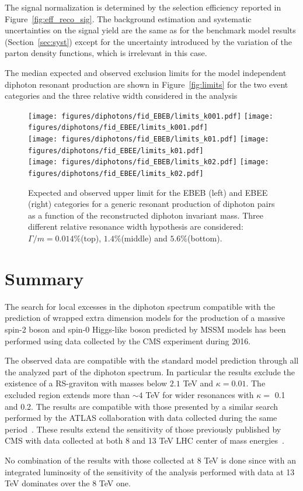 The signal normalization is determined by the selection efficiency reported in Figure~\ref{fig:eff_reco_sig}.
The background estimation and systematic uncertainties on the signal yield are the same as for the benchmark model
results (Section~\ref{sec:syst}) except for the uncertainty introduced by the variation of the parton density functions, which
is irrelevant in this case.

The median expected and observed exclusion limits for the model independent diphoton resonant production 
are shown in Figure~\ref{fig:limits} for the two event categories and the three relative width considered in the analysis

\begin{figure}[h!]
  \centering
  \texttt{[image: figures/diphotons/fid\_EBEB/limits\_k001.pdf]}
  \texttt{[image: figures/diphotons/fid\_EBEE/limits\_k001.pdf]}\\
  \texttt{[image: figures/diphotons/fid\_EBEB/limits\_k01.pdf]}
  \texttt{[image: figures/diphotons/fid\_EBEE/limits\_k01.pdf]}\\
  \texttt{[image: figures/diphotons/fid\_EBEB/limits\_k02.pdf]}
  \texttt{[image: figures/diphotons/fid\_EBEE/limits\_k02.pdf]}\\
    \caption{
      Expected and observed upper limit for the EBEB (left) and EBEE (right) categories for a generic
      resonant production of diphoton pairs as a function of the reconstructed diphoton invariant mass.
      Three different relative resonance width hypothesis are considered: $\Gamma/m = 0.014\%$(top), $1.4\%$(middle) and $5.6\%$(bottom).
    }
    \label{fig:fiducial_limits}
\end{figure}

\section{Summary}
\label{sec:dipho_summary}
The search for local excesses in the diphoton spectrum compatible with the prediction of wrapped extra dimension models
for the production of a massive spin-2 boson and spin-0 Higgs-like boson predicted by MSSM models
has been performed using data collected by the CMS experiment during 2016.

The observed data are compatible with the standard model prediction through all the analyzed part of the diphoton
spectrum. In particular the results exclude the existence of a RS-graviton with masses below $2.1$ TeV and $\kappa = 0.01$.
The excluded region extends more than $\sim 4$ TeV for wider resonances with $\kappa =$ 0.1 and 0.2.
The results are compatible with those presented by a similar search performed by the ATLAS collaboration with
data collected during the same period~\cite{atlas_dipho_2016}.
These results extend the sensitivity of those previously published by CMS with data collected at both 8 and 13 TeV
LHC center of mass energies~\cite{cms_dipho_2015, cms_dipho_2012_1, cms_dipho_2012_2}.

No combination of the results with those collected at 8 TeV is done since with an integrated luminosity of \lumisix
the sensitivity of the analysis performed with data at 13 TeV dominates over the 8 TeV one.